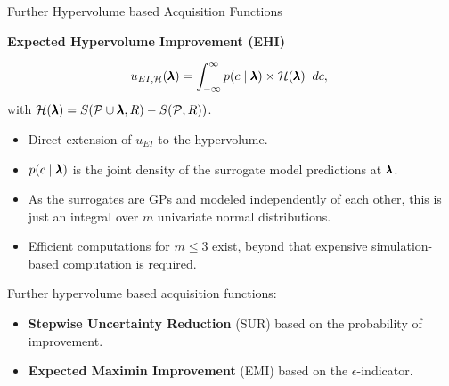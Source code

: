 \begin{frame}{Further Hypervolume based Acquisition Functions}

    \textbf{Expected Hypervolume Improvement (EHI)}~

$$
    u_{EI, \mathcal{H}}(\pmb{\lambda}) = \int_{-\infty}^{\infty} p(c \mid \pmb{\lambda}) \times \mathcal{H}(\pmb{\lambda})\;\; dc,\
$$
    with $\mathcal{H}(\pmb{\lambda}) = S(\mathcal{P} \cup \pmb{\lambda}, R) - S(\mathcal{P}, R))$.

    \begin{itemize}
        \item Direct extension of $u_{EI}$ to the hypervolume.
        \item $p(c \mid \pmb{\lambda})$ is the joint density of the surrogate model predictions at $\pmb{\lambda}$.
        \item As the surrogates are GPs and modeled independently of each other, this is just an integral over $m$ univariate normal distributions.
        \item Efficient computations for $m \le 3$ exist, beyond that expensive simulation-based computation is required.
    \end{itemize}


    \vspace{0.5cm}
Further hypervolume based acquisition functions:

    \begin{itemize}
        \item \textbf{Stepwise Uncertainty Reduction} (SUR) based on the probability of improvement.
        \item \textbf{Expected Maximin Improvement} (EMI) based on the $\epsilon$-indicator.
    \end{itemize}


\end{frame}

